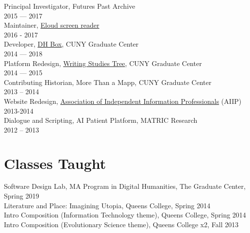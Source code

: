 \documentclass[11pt]{article}
\begin{document}
Principal Investigator, Futures Past Archive\\[0pt]
2015 — 2017\\[0pt]

Maintainer, \href{https://github.com/smythp/eloud}{Eloud screen reader}\\[0pt]
2016 - 2017\\[0pt]

Developer, \href{http://dhbox.org/}{DH Box}, CUNY Graduate Center\\[0pt]
2014 — 2018\\[0pt]

Platform Redesign, \href{http://www.writingstudiestree.org/}{Writing Studies Tree}, CUNY Graduate Center\\[0pt]
2014 — 2015\\[0pt]

Contributing Historian, More Than a Mapp, CUNY Graduate Center\\[0pt]
2013 – 2014\\[0pt]

Website Redesign, \href{http://www.aiip.org/}{Association of Independent Information Professionals} (AIIP)\\[0pt]
2013-2014\\[0pt]

Dialogue and Scripting, AI Patient Platform, MATRIC Research\\[0pt]
2012 – 2013\\[0pt]

\section*{Classes Taught}
\label{sec:orgd46b184}

Software Design Lab, MA Program in Digital Humanities, The Graduate Center, Spring 2019\\[0pt]
Literature and Place: Imagining Utopia, Queens College, Spring 2014\\[0pt]
Intro Composition (Information Technology theme), Queens College, Spring 2014\\[0pt]
Intro Composition (Evolutionary Science theme), Queens College x2, Fall 2013\\[0pt]
\end{document}
